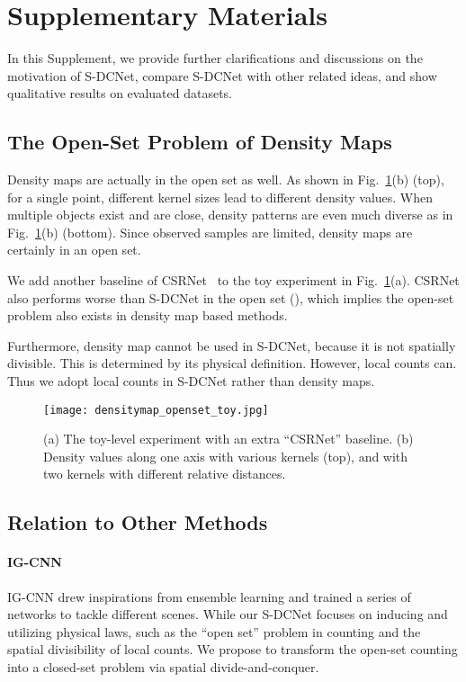 \documentclass[10pt,twocolumn,letterpaper]{article}
\begin{document}
	
	{\small
		
		
	}

\section{Supplementary Materials}
	In this Supplement, we provide further clarifications and discussions on the motivation of S-DCNet, compare S-DCNet with other related ideas, and show qualitative results on evaluated datasets.

\subsection{The Open-Set Problem of Density Maps}
Density maps are actually in the open set as well. As shown in Fig.~\ref{fig:toy_exp}(b) (top), for a single point, different kernel sizes lead to different density values. When multiple objects exist and are close, density patterns are even much diverse as in Fig.~\ref{fig:toy_exp}(b) (bottom). Since observed samples are limited, density maps are certainly in an open set.

We add another baseline of CSRNet~\cite{CSRNet_2018_CVPR} to the toy experiment in Fig.~\ref{fig:toy_exp}(a). CSRNet also performs worse than S-DCNet in the open set (), which implies the open-set problem also exists in density map based methods.

Furthermore, density map cannot be used in S-DCNet, because it is not spatially divisible. This is determined by its physical definition. However, local counts can. Thus we adopt local counts in S-DCNet rather than density maps.

\begin{figure}[!ht]
	\begin{center}
\texttt{[image: densitymap\_openset\_toy.jpg]}
	\end{center}
	\vspace{-10pt}
	\caption{(a) The toy-level experiment with an extra ``CSRNet'' baseline. (b) Density values along one axis with various kernels (top), and with two kernels with different relative distances.}
	\label{fig:toy_exp}
	\vspace{-15pt}
\end{figure}

\subsection{Relation to Other Methods}
\paragraph{IG-CNN~\cite{Divide_grow_2018_CVPR}}
IG-CNN drew inspirations from ensemble learning and trained a series of networks to tackle different scenes. While our S-DCNet focuses on inducing and utilizing physical laws, such as the “open set” problem in counting and the spatial divisibility of local counts. We propose to transform the open-set counting into a closed-set problem via spatial divide-and-conquer.  
\end{document}
